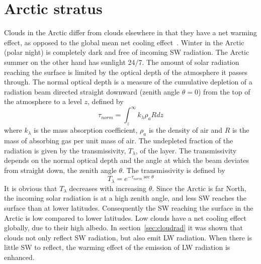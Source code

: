 
\section{Arctic stratus}
Clouds in the Arctic differ from clouds elsewhere in that they have a net warming effect, as opposed to the global mean net cooling effect~\citep{Shupe2004}. Winter in the Arctic (polar night) is completely dark and free of incoming SW radiation. The Arctic summer on the other hand has sunlight 24/7. The amount of solar radiation reaching the surface is limited by the optical depth of the atmosphere it passes through. The normal optical depth is a measure of the cumulative depletion of a radiation beam directed straight downward (zenith angle $\theta = 0$) from the top of the atmosphere to a level $z$, defined by~\citep{Wallace2006}
\begin{equation}
\tau_{norm} = \int_z^\infty k_{\lambda} \rho_a R dz
\end{equation}
where $k_{\lambda}$ is the mass absorption coefficient, $\rho_a$ is the density of air and $R$ is the mass of absorbing gas per unit mass of air.  The undepleted fraction of the radiation is given by the transmissivity, $T_{\lambda}$, of the layer. The transmissivity depends on the normal optical depth and the angle at which the beam deviates from straight down, the zenith angle $\theta$. The transmissivity is defined by~\citep{Wallace2006}
\begin{equation}
T_{\lambda} = e^{-\tau_{norm} \sec \theta}
\end{equation}
It is obvious that $T_{\lambda}$ decreases with increasing $\theta$. Since the Arctic is far North, the incoming solar radiation is at a high zenith angle, and less SW reaches the surface than at lower latitudes. Consequently the SW reaching the surface in the Arctic is low compared to lower latitudes. Low clouds have a net cooling effect globally, due to their high albedo. In section~\ref{sec:cloudrad} it was shown that clouds not only reflect SW radiation, but also emit LW radiation. When there is little SW to reflect, the warming effect of the emission of LW radiation is enhanced.



